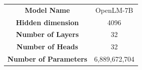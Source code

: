 \centering
    \resizebox{0.99\linewidth}{!}
    {
    \begin{tabular}{c|c}
    \toprule[1.5pt]
      {\bf Model Name} & OpenLM-7B\\
      {\bf Hidden dimension} & 4096\\
      {\bf Number of  Layers} & 32\\
      {\bf Number of  Heads} & 32\\
      {\bf Number of  Parameters} & 6,889,672,704\\
        \bottomrule[1pt]
    \end{tabular}
        }